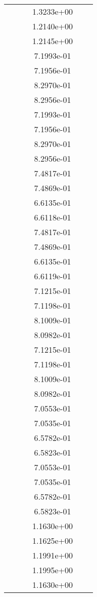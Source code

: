 \begin{xltabular}{\textwidth}{r|rS[table-format=1.3e+2]S[table-format=1.4e+2]S[table-format=1.4e+2]S[table-format=-1.5]}
&  &  & 1.3233e+00 & & \\
&  &  & 1.2140e+00 & & \\
&  &  & 1.2145e+00 & & \\
&  &  & 7.1993e-01 & & \\
&  &  & 7.1956e-01 & & \\
&  &  & 8.2970e-01 & & \\
&  &  & 8.2956e-01 & & \\
&  &  & 7.1993e-01 & & \\
&  &  & 7.1956e-01 & & \\
&  &  & 8.2970e-01 & & \\
&  &  & 8.2956e-01 & & \\
&  &  & 7.4817e-01 & & \\
&  &  & 7.4869e-01 & & \\
&  &  & 6.6135e-01 & & \\
&  &  & 6.6118e-01 & & \\
&  &  & 7.4817e-01 & & \\
&  &  & 7.4869e-01 & & \\
&  &  & 6.6135e-01 & & \\
&  &  & 6.6119e-01 & & \\
&  &  & 7.1215e-01 & & \\
&  &  & 7.1198e-01 & & \\
&  &  & 8.1009e-01 & & \\
&  &  & 8.0982e-01 & & \\
&  &  & 7.1215e-01 & & \\
&  &  & 7.1198e-01 & & \\
&  &  & 8.1009e-01 & & \\
&  &  & 8.0982e-01 & & \\
&  &  & 7.0553e-01 & & \\
&  &  & 7.0535e-01 & & \\
&  &  & 6.5782e-01 & & \\
&  &  & 6.5823e-01 & & \\
&  &  & 7.0553e-01 & & \\
&  &  & 7.0535e-01 & & \\
&  &  & 6.5782e-01 & & \\
&  &  & 6.5823e-01 & & \\
&  &  & 1.1630e+00 & & \\
&  &  & 1.1625e+00 & & \\
&  &  & 1.1991e+00 & & \\
&  &  & 1.1995e+00 & & \\
&  &  & 1.1630e+00 & & \\

\end{xltabular}
